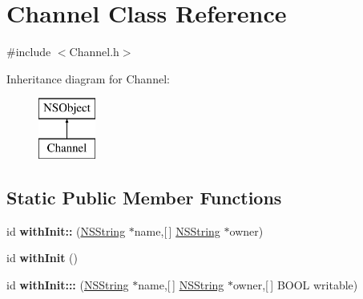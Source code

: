 \hypertarget{interface_channel}{
\section{\-Channel \-Class \-Reference}
\label{interface_channel}
}


{\ttfamily \#include $<$\-Channel.\-h$>$}

\-Inheritance diagram for \-Channel\-:\begin{figure}[H]
\begin{center}
\leavevmode
\includegraphics[height=2.000000cm]{interface_channel}
\end{center}
\end{figure}
\subsection*{\-Static \-Public \-Member \-Functions}
\begin{DoxyCompactItemize}
\item 
\hypertarget{interface_channel_abe225600e78759a3765c5a5af891b4ca}{
id {\bfseries with\-Init\-::} (\hyperlink{class_n_s_string}{\-N\-S\-String} $\ast$name,\mbox{[}$\,$\mbox{]} \hyperlink{class_n_s_string}{\-N\-S\-String} $\ast$owner)}
\label{interface_channel_abe225600e78759a3765c5a5af891b4ca}

\item 
\hypertarget{interface_channel_a0aab206e239acdec6d50bd8e328934ba}{
id {\bfseries with\-Init} ()}
\label{interface_channel_a0aab206e239acdec6d50bd8e328934ba}

\item 
\hypertarget{interface_channel_a8c36d05ce985b19155c3a873a0c1ba43}{
id {\bfseries with\-Init\-:::} (\hyperlink{class_n_s_string}{\-N\-S\-String} $\ast$name,\mbox{[}$\,$\mbox{]} \hyperlink{class_n_s_string}{\-N\-S\-String} $\ast$owner,\mbox{[}$\,$\mbox{]} \-B\-O\-O\-L writable)}
\label{interface_channel_a8c36d05ce985b19155c3a873a0c1ba43}

\end{DoxyCompactItemize}
